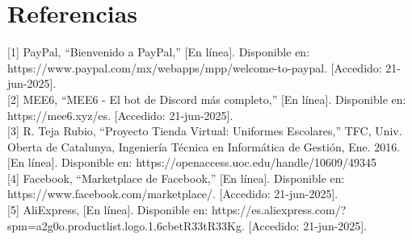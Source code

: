 \documentclass[a4paper,12pt]{article}
\begin{document}
\section{Referencias}

[1] PayPal, “Bienvenido a PayPal,” [En línea]. Disponible en: https://www.paypal.com/mx/webapps/mpp/welcome-to-paypal. [Accedido: 21-jun-2025].\\

[2] MEE6, “MEE6 - El bot de Discord más completo,” [En línea]. Disponible en: https://mee6.xyz/es. [Accedido: 21-jun-2025].\\

[3] R. Teja Rubio, “Proyecto Tienda Virtual: Uniformes Escolares,” TFC, Univ. Oberta de Catalunya, Ingeniería Técnica en Informática de Gestión, Ene. 2016. [En línea]. Disponible en: https://openaccess.uoc.edu/handle/10609/49345\\

[4] Facebook, “Marketplace de Facebook,” [En línea]. Disponible en: https://www.facebook.com/marketplace/. [Accedido: 21-jun-2025].\\

[5] AliExpress,  [En línea]. Disponible en: https://es.aliexpress.com/?spm=a2g0o.productlist.logo.1.6cbetR33tR33Kg. [Accedido: 21-jun-2025].\\
\end{document}

